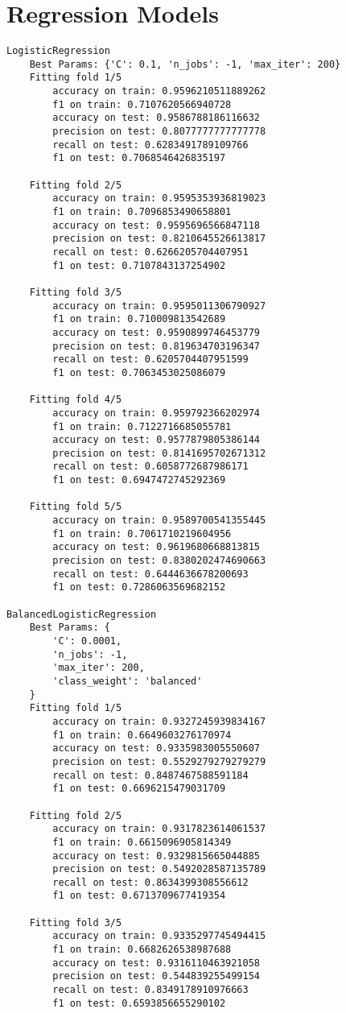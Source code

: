 \section{Regression Models}
\begin{Verbatim}
LogisticRegression
	Best Params: {'C': 0.1, 'n_jobs': -1, 'max_iter': 200}
	Fitting fold 1/5
		accuracy on train: 0.9596210511889262
		f1 on train: 0.7107620566940728
		accuracy on test: 0.9586788186116632
		precision on test: 0.8077777777777778
		recall on test: 0.6283491789109766
		f1 on test: 0.7068546426835197

	Fitting fold 2/5
		accuracy on train: 0.9595353936819023
		f1 on train: 0.7096853490658801
		accuracy on test: 0.9595696566847118
		precision on test: 0.8210645526613817
		recall on test: 0.6266205704407951
		f1 on test: 0.7107843137254902

	Fitting fold 3/5
		accuracy on train: 0.9595011306790927
		f1 on train: 0.710009813542689
		accuracy on test: 0.9590899746453779
		precision on test: 0.819634703196347
		recall on test: 0.6205704407951599
		f1 on test: 0.7063453025086079

	Fitting fold 4/5
		accuracy on train: 0.959792366202974
		f1 on train: 0.7122716685055781
		accuracy on test: 0.9577879805386144
		precision on test: 0.8141695702671312
		recall on test: 0.6058772687986171
		f1 on test: 0.6947472745292369

	Fitting fold 5/5
		accuracy on train: 0.9589700541355445
		f1 on train: 0.7061710219604956
		accuracy on test: 0.9619680668813815
		precision on test: 0.8380202474690663
		recall on test: 0.6444636678200693
		f1 on test: 0.7286063569682152

BalancedLogisticRegression
	Best Params: {
		'C': 0.0001,
		'n_jobs': -1,
		'max_iter': 200,
		'class_weight': 'balanced'
	}
	Fitting fold 1/5
		accuracy on train: 0.9327245939834167
		f1 on train: 0.6649603276170974
		accuracy on test: 0.9335983005550607
		precision on test: 0.5529279279279279
		recall on test: 0.8487467588591184
		f1 on test: 0.6696215479031709

	Fitting fold 2/5
		accuracy on train: 0.9317823614061537
		f1 on train: 0.6615096905814349
		accuracy on test: 0.9329815665044885
		precision on test: 0.5492028587135789
		recall on test: 0.8634399308556612
		f1 on test: 0.6713709677419354

	Fitting fold 3/5
		accuracy on train: 0.9335297745494415
		f1 on train: 0.6682626538987688
		accuracy on test: 0.9316110463921058
		precision on test: 0.544839255499154
		recall on test: 0.8349178910976663
		f1 on test: 0.6593856655290102


\end{Verbatim}
